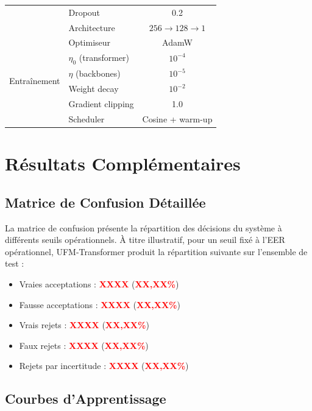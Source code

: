 \documentclass[12pt,a4paper]{report}
\begin{document}
\begin{table}[h]
\begin{tabular}{llc}
 & Dropout & 0.2 \\
 & Architecture & $256 \rightarrow 128 \rightarrow 1$ \\
\hline
\multirow{6}{*}{Entra\^{i}nement} & Optimiseur & AdamW \\
 & $\eta_0$ (transformer) & $10^{-4}$ \\
 & $\eta$ (backbones) & $10^{-5}$ \\
 & Weight decay & $10^{-2}$ \\
 & Gradient clipping & 1.0 \\
 & Scheduler & Cosine + warm-up \\
\hline
\hline
\end{tabular}
\end{table}

\chapter{R\'{e}sultats Compl\'{e}mentaires}
\label{ann:resultats}

\section{Matrice de Confusion D\'{e}taill\'{e}e}

La matrice de confusion pr\'{e}sente la r\'{e}partition des d\'{e}cisions du syst\`{e}me \`{a} diff\'{e}rents seuils op\'{e}rationnels. \`{A} titre illustratif, pour un seuil fix\'{e} \`{a} l'EER op\'{e}rationnel, UFM-Transformer produit la r\'{e}partition suivante sur l'ensemble de test :

\begin{itemize}
    \item Vraies acceptations : \textcolor{red}{\textbf{XXXX}} (\textcolor{red}{\textbf{XX,XX\%}})
    \item Fausse acceptations : \textcolor{red}{\textbf{XXXX}} (\textcolor{red}{\textbf{XX,XX\%}})
    \item Vrais rejets : \textcolor{red}{\textbf{XXXX}} (\textcolor{red}{\textbf{XX,XX\%}})
    \item Faux rejets : \textcolor{red}{\textbf{XXXX}} (\textcolor{red}{\textbf{XX,XX\%}})
    \item Rejets par incertitude : \textcolor{red}{\textbf{XXXX}} (\textcolor{red}{\textbf{XX,XX\%}})
\end{itemize}

\section{Courbes d'Apprentissage}
\end{document}
